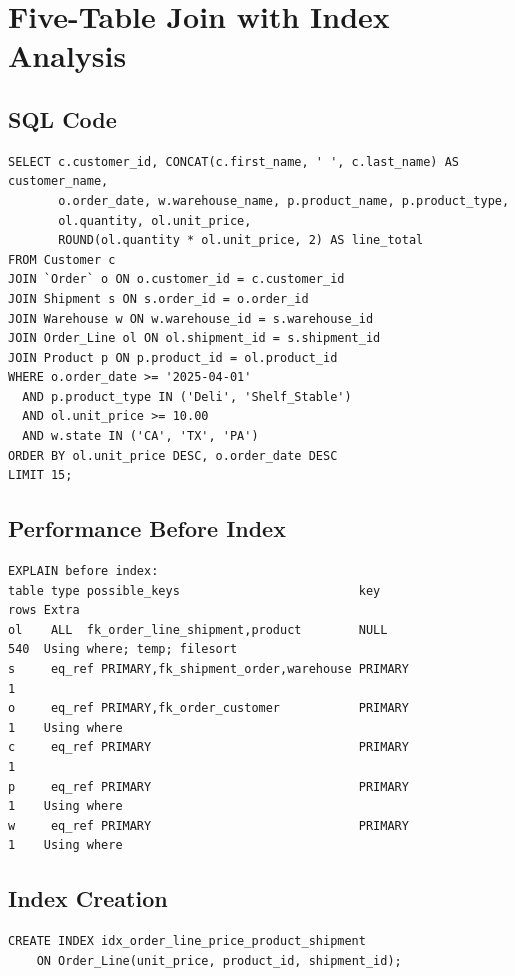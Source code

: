 \section{Five-Table Join with Index Analysis}

\subsection{SQL Code}
{\scriptsize
\begin{verbatim}
SELECT c.customer_id, CONCAT(c.first_name, ' ', c.last_name) AS customer_name,
       o.order_date, w.warehouse_name, p.product_name, p.product_type,
       ol.quantity, ol.unit_price,
       ROUND(ol.quantity * ol.unit_price, 2) AS line_total
FROM Customer c
JOIN `Order` o ON o.customer_id = c.customer_id
JOIN Shipment s ON s.order_id = o.order_id
JOIN Warehouse w ON w.warehouse_id = s.warehouse_id
JOIN Order_Line ol ON ol.shipment_id = s.shipment_id
JOIN Product p ON p.product_id = ol.product_id
WHERE o.order_date >= '2025-04-01'
  AND p.product_type IN ('Deli', 'Shelf_Stable')
  AND ol.unit_price >= 10.00
  AND w.state IN ('CA', 'TX', 'PA')
ORDER BY ol.unit_price DESC, o.order_date DESC
LIMIT 15;
\end{verbatim}
}

\subsection{Performance Before Index}
{\scriptsize
\begin{verbatim}
EXPLAIN before index:
table type possible_keys                         key                    rows Extra
ol    ALL  fk_order_line_shipment,product        NULL                   540  Using where; temp; filesort
s     eq_ref PRIMARY,fk_shipment_order,warehouse PRIMARY                1
o     eq_ref PRIMARY,fk_order_customer           PRIMARY                1    Using where
c     eq_ref PRIMARY                             PRIMARY                1
p     eq_ref PRIMARY                             PRIMARY                1    Using where
w     eq_ref PRIMARY                             PRIMARY                1    Using where
\end{verbatim}
}

\subsection{Index Creation}
{\scriptsize
\begin{verbatim}
CREATE INDEX idx_order_line_price_product_shipment
    ON Order_Line(unit_price, product_id, shipment_id);
\end{verbatim}
}

